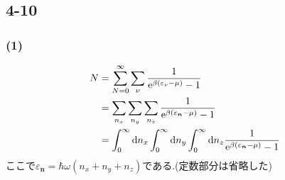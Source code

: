\subsection*{4-10}
\subsubsection*{(1)}
\begin{align}
  \begin{split}
    N&=\sum_{N=0}^\infty\sum_\nu\frac{1}{{\rm e}^{\beta(\varepsilon_\nu-\mu)}-1}\\
    &=\sum_{n_x}\sum_{n_y}\sum_{n_z}\frac{1}{{\rm e}^{\beta(\varepsilon_{\bm n}-\mu)}-1}\\
    &=\int_0^{\infty}{\rm d}{n_x}\int_0^{\infty}{\rm d}{n_y}\int_0^{\infty}{\rm d}{n_z}\frac{1}{{\rm e}^{\beta(\varepsilon_{\bm n}-\mu)}-1}
  \end{split}
\end{align}
ここで$\varepsilon_{\bm n}=\hbar\omega(n_x+n_y+n_z)$である.(定数部分は省略した)
